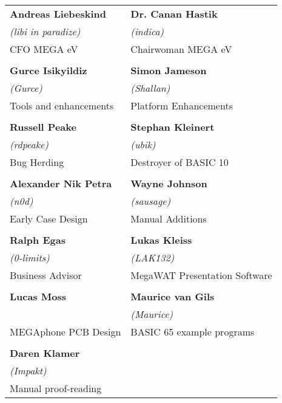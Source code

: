 \setlength{\tabcolsep}{1mm}
\begin{tabular}{p{6cm}p{6cm}}

{\large\bf Andreas Liebeskind}     & {\large\bf Dr. Canan Hastik} \\
 \textit{(libi in paradize)}       & \textit{(indica)} \\
CFO MEGA eV                        & Chairwoman MEGA eV \\
& \\
{\large\bf Gurce Isikyildiz}       & {\large\bf Simon Jameson} \\
 \textit{(Gurce)}                  &  \textit{(Shallan)} \\
Tools and enhancements             & Platform Enhancements \\
& \\
{\large\bf Russell Peake}          & {\large\bf Stephan Kleinert} \\
  \textit{(rdpeake)}               & \textit{(ubik)}        \\
Bug Herding                        & Destroyer of BASIC 10     \\
& \\
{\large\bf Alexander Nik Petra}    & {\large\bf Wayne Johnson} \\
 \textit{(n0d)}                    &  \textit{(sausage)} \\
Early Case Design                  & Manual Additions \\
& \\
{\large\bf Ralph Egas}             & {\large\bf Lukas Kleiss} \\
 \textit{(0-limits)}               & \textit{(LAK132)} \\
Business Advisor                   & MegaWAT Presentation Software \\
& \\
{\large\bf Lucas Moss}             & {\large\bf Maurice van Gils }  \\
                                   & \textit{(Maurice)}  \\
MEGAphone PCB Design               & BASIC 65 example programs \\
& \\
{\large\bf Daren Klamer}           & \\
 \textit{(Impakt)}                 & \\
Manual proof-reading               & \\
\end{tabular}

